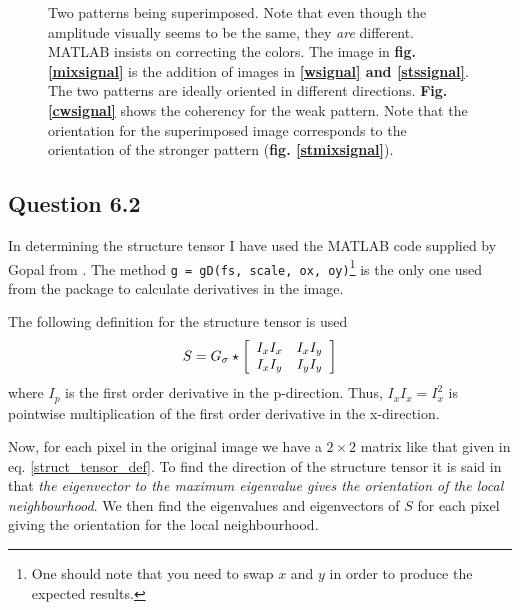 \documentclass[a4paper, 10pt, final]{article}
\begin{document}
\begin{figure}[!h]
    \caption[]{Two patterns being superimposed. Note that even though
    the amplitude visually seems to be the same, they \emph{are}
    different. MATLAB insists on correcting the colors. The image in
    \textbf{fig. \ref{mixsignal}} is the addition of images in
    \textbf{\ref{wsignal} and \ref{stssignal}}. The two patterns are
    ideally oriented in different directions. \textbf{Fig.
    \ref{cwsignal}} shows the coherency for the weak pattern. Note that
    the orientation for the superimposed image corresponds to the
    orientation of the stronger pattern (\textbf{fig. \ref{stmixsignal}}).}
    \label{superimposed}
\end{figure}
\clearpage

\subsection*{Question 6.2}
In determining the structure tensor I have used the MATLAB code supplied
by Gopal from \citep{nonlindiff}. The method \texttt{g = gD(fs, scale,
ox, oy)}\footnote{One should note that you need to swap $x$ and
$y$ in order to produce the expected results.} is the only one used from
the package to calculate derivatives in the image.

The following definition for the structure tensor is used
\begin{equation}
    S = G_\sigma \star \left[\begin{array}{c c}
        I_xI_x & I_xI_y \\
        I_xI_y & I_yI_y
    \end{array}
    \right]
    \label{struct_tensor_def}
\end{equation}
where $I_p$ is the first order derivative in the p-direction. Thus,
$I_xI_x = I_x^2$ is pointwise multiplication of the first order
derivative in the x-direction.

Now, for each pixel in the original image we have a $2\times2$ matrix
like that given in eq. \eqref{struct_tensor_def}. To find the direction
of the structure tensor it is said in \citep[p. 366]{jahne-digital} that
\emph{the eigenvector to the maximum eigenvalue gives the orientation
of the local neighbourhood}. We then find the eigenvalues and
eigenvectors of $S$ for each pixel giving the orientation for the local
neighbourhood.
\end{document}
